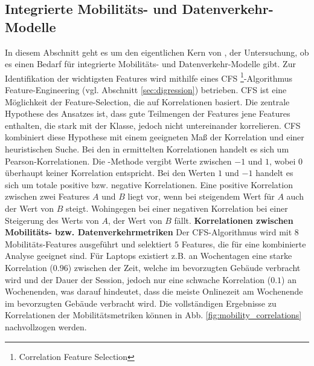\documentclass[12pt, a4paper]{article}
\begin{document}
\subsection{Integrierte Mobilitäts- und Datenverkehr-Modelle}
\label{sec:phase3}

In diesem Abschnitt geht es um den eigentlichen Kern von \cite{Alipour2018}, der Untersuchung, ob es einen Bedarf
für integrierte Mobilitäts- und Datenverkehr-Modelle gibt. Zur Identifikation der wichtigsten Features wird
mithilfe eines \textsc{CFS} \footnote{Correlation Feature Selection}-Algorithmus
Feature-Engineering (vgl. Abschnitt \ref{sec:digression}) betrieben. \textsc{CFS} ist eine Möglichkeit der Feature-Selection,
die auf Korrelationen basiert. Die zentrale Hypothese des Ansatzes ist, dass gute Teilmengen der Features jene Features enthalten,
die stark mit der Klasse, jedoch nicht untereinander korrelieren. \textsc{CFS} kombiniert diese Hypothese mit einem geeigneten
Maß der Korrelation und einer heuristischen Suche. \cite{Hall2000}
Bei den in \cite{Alipour2018} ermittelten Korrelationen handelt es sich um Pearson-Korrelationen.
Die -Methode vergibt Werte zwischen $-1$ und $1$, wobei $0$ überhaupt keiner Korrelation
entspricht. Bei den Werten $1$ und $-1$ handelt es sich um totale positive bzw. negative Korrelationen.
Eine positive Korrelation zwischen zwei Features $A$ und $B$ liegt vor, wenn bei steigendem Wert für $A$
auch der Wert von $B$ steigt. Wohingegen bei einer negativen Korrelation bei einer Steigerung des Werts von $A$, 
der Wert von $B$ fällt. \cite{Nettleton2014}
\newline\newline\newline
\textbf{Korrelationen zwischen Mobilitäts- bzw. Datenverkehrmetriken}
\newline\newline
Der \textsc{CFS}-Algorithmus wird mit $8$ Mobilitäts-Features ausgeführt und selektiert $5$ Features, 
die für eine kombinierte Analyse geeignet sind. Für Laptops existiert z.B. an Wochentagen eine starke Korrelation ($0.96$)
zwischen der Zeit, welche im bevorzugten Gebäude verbracht wird und der Dauer der Session, jedoch nur eine schwache Korrelation
($0.1$) an Wochenenden, was darauf hindeutet, dass die meiste Onlinezeit am Wochenende im bevorzugten
Gebäude verbracht wird. \cite{Alipour2018} Die vollständigen Ergebnisse zu Korrelationen der Mobilitätsmetriken können in
Abb. \ref{fig:mobility_correlations} nachvollzogen werden.\newline
\end{document}
